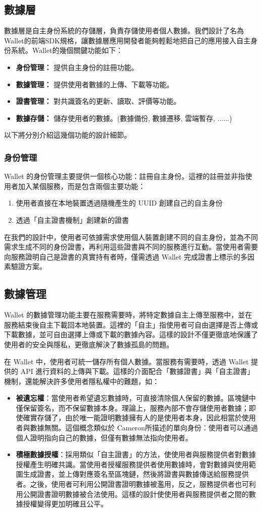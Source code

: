 \subsection{數據層}
數據層是自主身份系統的存儲層，負責存儲使用者個人數據。我們設計了名為Wallet的前端SDK規格，讓數據層應用開發者能夠輕鬆地把自己的應用接入自主身份系統。Wallet的幾個關鍵功能如下：
\begin{itemize}
  \item \textbf{身份管理：} 提供自主身份的註冊功能。
  \item \textbf{數據管理：} 提供使用者數據的上傳、下載等功能。
  \item \textbf{證書管理：} 對共識簽名的更新、讀取、評價等功能。
  \item \textbf{數據存儲：} 儲存使用者的數據。(數據備份, 數據遷移, 雲端暫存, ......)
\end{itemize}
以下將分別介紹這幾個功能的設計細節。
\subsubsection{身份管理}
Wallet 的身份管理主要提供一個核心功能：註冊自主身份。這裡的註冊並非指使用者加入某個服務，而是包含兩個主要功能：
\begin{enumerate}
  \item 使用者直接在本地裝置透過隨機產生的 UUID 創建自己的自主身份
  \item 透過「自主證書機制」創建新的證書
\end{enumerate}
在我們的設計中，使用者可依據需求使用個人裝置創建不同的自主身份，並為不同需求生成不同的身份證書，再利用這些證書與不同的服務進行互動。當使用者需要向服務證明自己是證書的真實持有者時，僅需透過 Wallet 完成證書上標示的多因素驗證方案。
\subsection{數據管理}
Wallet 的數據管理功能主要在服務需要時，將特定數據自主上傳至服務中，並在服務結束後自主下載回本地裝置。這裡的「自主」指使用者可自由選擇是否上傳或下載數據，並可自由選擇上傳或下載的數據內容。這樣的設計不僅更徹底地保護了使用者的安全與隱私，更徹底解決了數據孤島的問題。

在 Wallet 中，使用者可統一儲存所有個人數據。當服務有需要時，透過 Wallet 提供的 API 進行資料的上傳與下載。這樣的介面配合「數據證書」與「自主證書」機制，還能解決許多使用者隱私權中的難題，如：
\begin{itemize}
  \item \textbf{被遺忘權}：當使用者希望遺忘數據時，可直接清除個人保留的數據。區塊鏈中僅保留簽名，而不保留數據本身。理論上，服務內部不會存儲使用者數據；即使確實存儲了，由於唯一能證明數據擁有人的是使用者本身，因此相當於使用者與數據無關。這個概念類似於 Cameron\cite{cameron2005laws}所描述的單向身份：使用者可以通過個人證明指向自己的數據，但僅有數據無法指向使用者。
  \item \textbf{積極數據授權}：採用類似「自主證書」的方法，使使用者與服務提供者對數據授權產生明確共識。當使用者授權服務提供者使用數據時，會對數據與使用範圍生成證書，並上傳對應簽名至區塊鏈，然後將證書與數據傳送給服務提供者。之後，使用者可利用公開證書證明數據被濫用，反之，服務提供者也可利用公開證書證明數據被合法使用。這樣的設計使使用者與服務提供者之間的數據授權變得更加明確且公平。
\end{itemize}
